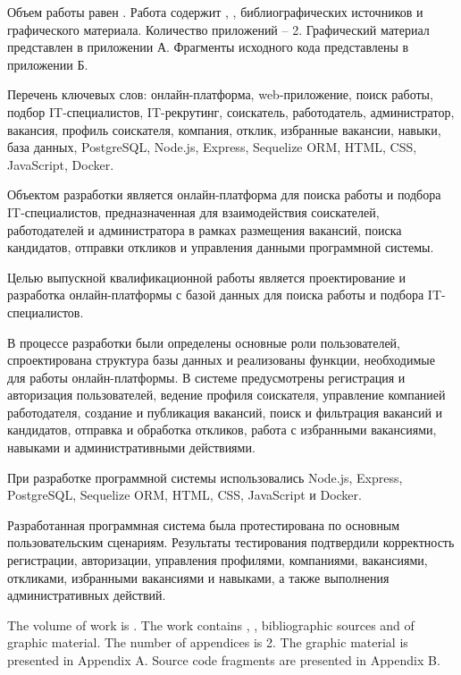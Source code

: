 
Объем работы равен . Работа содержит , ,  библиографических источников и  графического материала. Количество приложений – 2. Графический материал представлен в приложении А. Фрагменты исходного кода представлены в приложении Б.

Перечень ключевых слов: онлайн-платформа, web-приложение, поиск работы, подбор IT-специалистов, IT-рекрутинг, соискатель, работодатель, администратор, вакансия, профиль соискателя, компания, отклик, избранные вакансии, навыки, база данных, PostgreSQL, Node.js, Express, Sequelize ORM, HTML, CSS, JavaScript, Docker.

Объектом разработки является онлайн-платформа для поиска работы и подбора IT-специалистов, предназначенная для взаимодействия соискателей, работодателей и администратора в рамках размещения вакансий, поиска кандидатов, отправки откликов и управления данными программной системы.

Целью выпускной квалификационной работы является проектирование и разработка онлайн-платформы с базой данных для поиска работы и подбора IT-специалистов.

В процессе разработки были определены основные роли пользователей, спроектирована структура базы данных и реализованы функции, необходимые для работы онлайн-платформы. В системе предусмотрены регистрация и авторизация пользователей, ведение профиля соискателя, управление компанией работодателя, создание и публикация вакансий, поиск и фильтрация вакансий и кандидатов, отправка и обработка откликов, работа с избранными вакансиями, навыками и административными действиями.

При разработке программной системы использовались Node.js, Express, PostgreSQL, Sequelize ORM, HTML, CSS, JavaScript и Docker.

Разработанная программная система была протестирована по основным пользовательским сценариям. Результаты тестирования подтвердили корректность регистрации, авторизации, управления профилями, компаниями, вакансиями, откликами, избранными вакансиями и навыками, а также выполнения административных действий.

  
The volume of work is . The work contains , ,  bibliographic sources and  of graphic material. The number of appendices is 2. The graphic material is presented in Appendix A. Source code fragments are presented in Appendix B.

